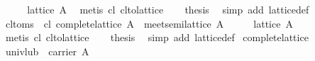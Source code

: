 \begin{isabellebody}
%
\isadelimproof
%
\endisadelimproof
%
\isatagproof
{}\isamarkupfalse%
\ {}\isanewline
\ \ \isamarkupfalse%
\ {}lattice\ A{}\ \isamarkupfalse%
\ {}metis\ cl\ cl{}to{}lattice{}\isanewline
\ \ \isamarkupfalse%
\ {}thesis\ \isamarkupfalse%
\ {}simp\ add{}\ lattice{}def{}\isanewline
{}\isamarkupfalse%
%
\endisatagproof
{\isafoldproof}%
%
\isadelimproof
\isanewline
%
\endisadelimproof
\isanewline
{}\isamarkupfalse%
\ cl{}to{}ms{}\ \ cl{}\ {}complete{}lattice\ A{}\ \ {}meet{}semilattice\ A{}\isanewline
%
\isadelimproof
%
\endisadelimproof
%
\isatagproof
{}\isamarkupfalse%
\ {}\isanewline
\ \ \isamarkupfalse%
\ {}lattice\ A{}\ \isamarkupfalse%
\ {}metis\ cl\ cl{}to{}lattice{}\isanewline
\ \ \isamarkupfalse%
\ {}thesis\ \isamarkupfalse%
\ {}simp\ add{}\ lattice{}def{}\isanewline
{}\isamarkupfalse%
%
\endisatagproof
{\isafoldproof}%
%
\isadelimproof
\isanewline
%
\endisadelimproof
\isanewline
{}\isamarkupfalse%
\ complete{}lattice\isanewline
{}\isanewline
\isanewline
\ \ \isamarkupfalse%
\ univ{}lub{}\ {}{}\ {}carrier\ A{}\ {}\ {}{}\isanewline

\end{isabellebody}
